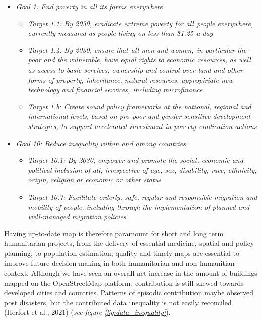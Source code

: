\documentclass[11pt, a4paper, twoside]{report}
\begin{document}
\begin{itemize}
  \item \textit{Goal 1: End poverty in all its forms everywhere}
  \begin{itemize}
    \item \textit{Target 1.1: By 2030, eradicate extreme poverty for all people everywhere, currently measured as people living on less than \$1.25 a day}
    \item \textit{Target 1.4: By 2030, ensure that all men and women, in particular the poor and the vulnerable, have equal rights to economic resources, as well as access to basic services, ownership and control over land and other forms of property, inheritance, natural resources, appropiriate new technology and financial services, including microfinance}
    \item \textit{Target 1.b: Create sound policy frameworks at the national, regional and international levels, based on pro-poor and gender-sensitive development strategies, to support accelerated investment in poverty eradication actions}
  \end{itemize}
  \item \textit{Goal 10: Reduce inequality within and among countries}
  \begin{itemize}
    \item \textit{Target 10.1: By 2030, empower and promote the social, economic and political inclusion of all, irrespective of age, sex, disability, race, ethnicity, origin, religion or economic or other status}
    \item \textit{Target 10.7: Facilitate orderly, safe, regular and responsible migration and mobility of people, including through the implementation of planned and well-managed migration policies}
  \end{itemize}
\end{itemize}

Having up-to-date map is therefore paramount for short and long term humanitarian projects, from the delivery of essential medicine, spatial and policy planning, to population estimation, quality and timely maps are essential to improve future decision making in both humanitarian and non-humanitian context. Although we have seen an overall net increase in the amount of buildings mapped on the OpenStreetMap platform, contribution is still skewed towards developed cities and countries. Patterns of episodic contribution maybe observed post disasters, but the contributed data inequality is not easily reconciled (Herfort et al., 2021) (\textit{see figure \ref{fig:data_inequality}}).\\\par
\end{document}
